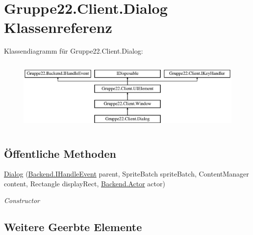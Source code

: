 \hypertarget{class_gruppe22_1_1_client_1_1_dialog}{\section{Gruppe22.\-Client.\-Dialog Klassenreferenz}
\label{class_gruppe22_1_1_client_1_1_dialog}
}
Klassendiagramm für Gruppe22.\-Client.\-Dialog\-:\begin{figure}[H]
\begin{center}
\leavevmode
\includegraphics[height=3.589744cm]{class_gruppe22_1_1_client_1_1_dialog}
\end{center}
\end{figure}
\subsection*{Öffentliche Methoden}
\begin{DoxyCompactItemize}
\item 
\hyperlink{class_gruppe22_1_1_client_1_1_dialog_a4cc28aa4711abd90a9c16d85464ca192}{Dialog} (\hyperlink{interface_gruppe22_1_1_backend_1_1_i_handle_event}{Backend.\-I\-Handle\-Event} parent, Sprite\-Batch sprite\-Batch, Content\-Manager content, Rectangle display\-Rect, \hyperlink{class_gruppe22_1_1_backend_1_1_actor}{Backend.\-Actor} actor)
\begin{DoxyCompactList}\small\item\em Constructor \end{DoxyCompactList}\end{DoxyCompactItemize}
\subsection*{Weitere Geerbte Elemente}


